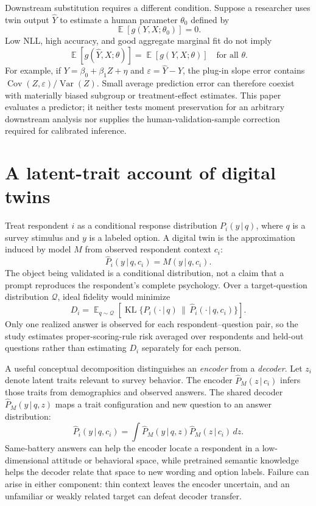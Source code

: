 \documentclass[11pt]{article}
\newcommand{\given}{\,\vert\,}
\newcommand{\twin}{\widehat P}
\DeclareMathOperator*{\E}{\mathbb E}
\DeclareMathOperator{\KL}{KL}
\begin{document}
Downstream substitution requires a different condition. Suppose a researcher
uses twin output $\widehat Y$ to estimate a human parameter $\theta_0$ defined
by
\[
 \E[g(Y,X;\theta_0)]=0.
\]
Low NLL, high accuracy, and good aggregate marginal fit do not imply
\[
 \E[g(\widehat Y,X;\theta)]
   =\E[g(Y,X;\theta)]\quad\text{for all }\theta.
\]
For example, if $Y=\beta_0+\beta_1Z+\eta$ and
$\varepsilon=\widehat Y-Y$, the plug-in slope error contains
$\operatorname{Cov}(Z,\varepsilon)/\operatorname{Var}(Z)$. Small average
prediction error can therefore coexist with materially biased subgroup or
treatment-effect estimates. This paper evaluates a predictor; it neither tests
moment preservation for an arbitrary downstream analysis nor supplies the
human-validation-sample correction required for calibrated inference.

\section{A latent-trait account of digital twins}
Treat respondent $i$ as a conditional response distribution
$P_i(y\given q)$, where $q$ is a survey stimulus and $y$ is a labeled option.
A digital twin is the approximation induced by model $M$ from observed
respondent context $c_i$:
\[
  \twin_i(y\given q,c_i)=M(y\given q,c_i).
\]
The object being validated is a conditional distribution, not a claim that a
prompt reproduces the respondent's complete psychology. Over a target-question
distribution $\mathcal Q$, ideal fidelity would minimize
\[
 D_i=\E_{q\sim\mathcal Q}\!
 \left[\KL\{P_i(\cdot\given q)\,\|\,\twin_i(\cdot\given q,c_i)\}\right].
\]
Only one realized answer is observed for each respondent--question pair, so the
study estimates proper-scoring-rule risk averaged over respondents and held-out
questions rather than estimating $D_i$ separately for each person.

A useful conceptual decomposition distinguishes an \emph{encoder} from a
\emph{decoder}. Let $z_i$ denote latent traits relevant to survey behavior.
The encoder $\widehat P_M(z\given c_i)$ infers those traits from demographics
and observed answers. The shared decoder $\widehat P_M(y\given q,z)$ maps a
trait configuration and new question to an answer distribution:
\[
 \twin_i(y\given q,c_i)=
 \int \widehat P_M(y\given q,z)\widehat P_M(z\given c_i)\,dz.
\]
Same-battery answers can help the encoder locate a respondent in a low-
dimensional attitude or behavioral space, while pretrained semantic knowledge
helps the decoder relate that space to new wording and option labels. Failure
can arise in either component: thin context leaves the encoder uncertain, and
an unfamiliar or weakly related target can defeat decoder transfer.
\end{document}
